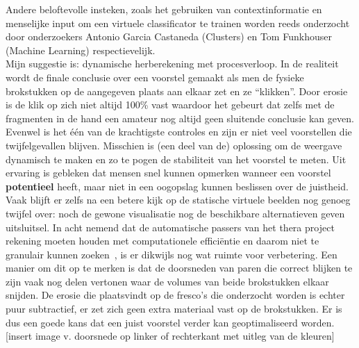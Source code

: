 Andere beloftevolle insteken, zoals het gebruiken van contextinformatie en menselijke input om een virtuele classificator te trainen worden reeds onderzocht door onderzoekers Antonio Garcia Castaneda (Clusters) en Tom Funkhouser (Machine Learning) respectievelijk.\\

Mijn suggestie is: dynamische herberekening met procesverloop. In de realiteit wordt de finale conclusie over een voorstel gemaakt als men de fysieke brokstukken op de aangegeven plaats aan elkaar zet en ze ``klikken''. Door erosie is de klik op zich niet altijd 100\% vast waardoor het gebeurt dat zelfs met de fragmenten in de hand een amateur nog altijd geen sluitende conclusie kan geven. Evenwel is het \'e\'en van de krachtigste controles en zijn er niet veel voorstellen die twijfelgevallen blijven. Misschien is (een deel van de) oplossing om de weergave dynamisch te maken en zo te pogen de stabiliteit van het voorstel te meten. Uit ervaring is gebleken dat mensen snel kunnen opmerken wanneer een voorstel \textbf{potentieel} heeft, maar niet in een oogopslag kunnen beslissen over de juistheid. Vaak blijft er zelfs na een betere kijk op de statische virtuele beelden nog genoeg twijfel over: noch de gewone visualisatie nog de beschikbare alternatieven geven uitsluitsel. In acht nemend dat de automatische passers van het thera project rekening moeten houden met computationele effici\"entie en daarom niet te granulair kunnen zoeken~\cite{Brown2008}, is er dikwijls nog wat ruimte voor verbetering. Een manier om dit op te merken is dat de doorsneden van paren die correct blijken te zijn vaak nog delen vertonen waar de volumes van beide brokstukken elkaar snijden. De erosie die plaatsvindt op de fresco's die onderzocht worden is echter puur subtractief, er zet zich geen extra materiaal vast op de brokstukken. Er is dus een goede kans dat een juist voorstel verder kan geoptimaliseerd worden.\\

[insert image v. doorsnede op linker of rechterkant met uitleg van de kleuren]\\

